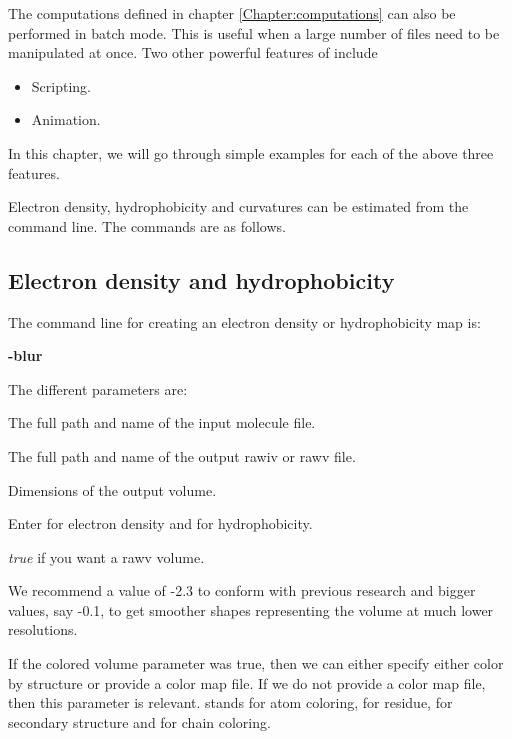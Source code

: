 
The computations defined in chapter \ref{Chapter:computations} can
also be performed in batch mode. This is useful when a large number
of files need to be manipulated at once. Two other powerful features
of \TexMol include
\begin{itemize}
\item Scripting.
\item Animation.
\end{itemize}
In this chapter, we will go through simple examples for each of the
above three features.


Electron density, hydrophobicity and curvatures can be estimated
from the command line. The commands are as follows.

\subsection{Electron density and hydrophobicity}

The command line for creating an electron density or hydrophobicity
map is:

\TexMol \textbf{-blur} 
  
  
  

The different parameters are:

 The full path and name of the input molecule
file.

 The full path and name of the output
rawiv or rawv file.

 Dimensions of the output volume.

 Enter  for electron density and  for
hydrophobicity.

 \emph{true} if you want a rawv volume.

 We recommend a value of -2.3 to conform
with previous research and bigger values, say -0.1, to get smoother
shapes representing the volume at much lower resolutions.

 If the colored volume parameter was true, then we can
either specify either color by structure or provide a color map
file. If we do not provide a color map file, then this parameter is
relevant.  stands for atom coloring,  for residue,
 for secondary structure and  for chain coloring.

